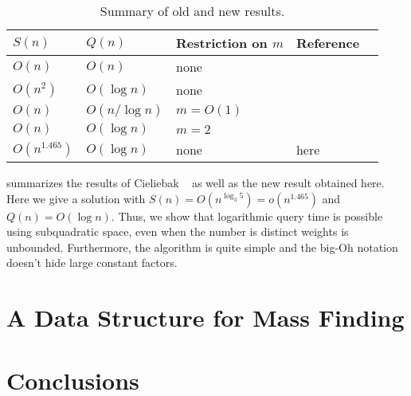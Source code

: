 \documentclass[ccfonts,lotsofwhite]{patmorin}
\begin{document}
\begin{table}
\begin{center}
\begin{tabular}{|l|l|l|l|l|}\hline
$S(n)$ & $Q(n)$ & Restriction on $m$ & Reference \\ \hline\hline
$O(n)$ & $O(n)$ & none & \cite{cels02b} \\
$O(n^2)$ & $O(\log n)$ & none & \cite{cels02b} \\
$O(n)$ & $O(n/\log n)$ & $m=O(1)$ & \cite{cels02b} \\
$O(n)$ & $O(\log n)$ & $m=2$ & \cite{cels02b} \\
$O(n^{1.465})$ & $O(\log n)$ & none & here \\ \hline
\end{tabular}
\end{center}
\caption{Summary of old and new results.}
\end{table}

 summarizes the results of Cieliebak \etal\
\cite{cels02b,cels01b} as well as the new result obtained here.  Here
we give a solution with $S(n)=O(n^{\log_3 5})=o(n^{1.465})$ and
$Q(n)=O(\log n)$.  Thus, we show that logarithmic query time is
possible using subquadratic space, even when the number is distinct
weights is unbounded.  Furthermore, the algorithm is quite simple and
the big-Oh notation doesn't hide large constant factors.



\section{A Data Structure for Mass Finding}

\section{Conclusions}



\end{document}
